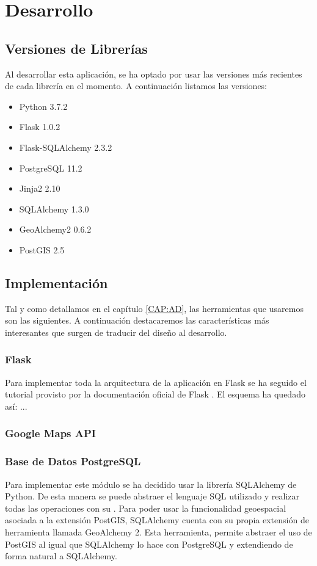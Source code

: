 \chapter{Desarrollo\label{CAP:DESARROLLO}}
  \section{Versiones de Librerías}
    Al desarrollar esta aplicación, se ha optado por usar las versiones más recientes de cada librería en el momento. A continuación listamos las versiones:
    \begin{itemize}
      \item Python 3.7.2
      \item Flask 1.0.2
      \item Flask-SQLAlchemy 2.3.2
      \item PostgreSQL 11.2
      \item Jinja2 2.10
      \item SQLAlchemy 1.3.0 
      \item GeoAlchemy2 0.6.2
      \item PostGIS 2.5
    \end{itemize}
  \section{Implementación}
    Tal y como detallamos en el capítulo \ref{CAP:AD}, las herramientas que usaremos son las siguientes. A continuación destacaremos las características más interesantes que surgen de traducir del diseño al desarrollo.
    \subsection{Flask}
      Para implementar toda la arquitectura de la aplicación en Flask se ha seguido el tutorial provisto por la documentación oficial de Flask \cite{flask}. El esquema ha quedado así:
      ...        
    \subsection{Google Maps API}
    
    \subsection{Base de Datos PostgreSQL}
      Para implementar este módulo se ha decidido usar la librería SQLAlchemy\cite{sqlalchemy} de Python. De esta manera se puede abstraer el lenguaje SQL utilizado y realizar todas las operaciones con su . 
      Para poder usar la funcionalidad geoespacial asociada a la extensión PostGIS, SQLAlchemy cuenta con su propia extensión de herramienta llamada GeoAlchemy 2\cite{geoalchemy}. Esta herramienta, permite abstraer el uso de PostGIS al igual que SQLAlchemy lo hace con PostgreSQL y extendiendo de forma natural a SQLAlchemy.
  
